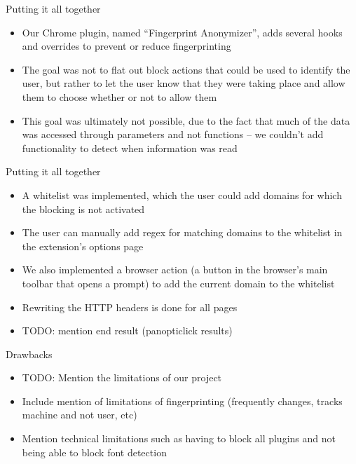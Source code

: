 \begin{frame}[fragile,t]{Putting it all together}
	\begin{itemize}
		\item Our Chrome plugin, named ``Fingerprint Anonymizer'', adds several hooks and overrides to prevent or reduce fingerprinting
		\item The goal was not to flat out block actions that could be used to identify the user, but rather to let the user know that they were taking place and allow them to choose whether or not to allow them
		\item This goal was ultimately not possible, due to the fact that much of the data was accessed through parameters and not functions -- we couldn't add functionality to detect when information was read
	\end{itemize}
\end{frame}

\begin{frame}[fragile,t]{Putting it all together}
	\begin{itemize}
		\item A whitelist was implemented, which the user could add domains for which the blocking is not activated
		\item The user can manually add regex for matching domains to the whitelist in the extension's options page
		\item We also implemented a browser action (a button in the browser's main toolbar that opens a prompt) to add the current domain to the whitelist
		\item Rewriting the HTTP headers is done for all pages
		\item TODO: mention end result (panopticlick results)
	\end{itemize}
\end{frame}

\begin{frame}[fragile,t]{Drawbacks}
	\begin{itemize}
		\item TODO: Mention the limitations of our project
		\item Include mention of limitations of fingerprinting (frequently changes, tracks machine and not user, etc)
		\item Mention technical limitations such as having to block all plugins and not being able to block font detection
	\end{itemize}
\end{frame}

